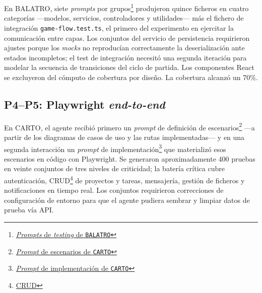 En \ac{BALATRO}, siete \textit{prompts} por grupos\footnote{\href{https://github.com/alu0101549491/TFG-Fabian-Gonzalez-Lence/tree/main/resources/prompts/3-MiniBalatro/5-TestingPorGrupodeModulos}{\textit{Prompts} de \textit{testing} de \texttt{BALATRO}}} produjeron quince ficheros en cuatro categorías ---modelos, servicios, controladores y utilidades--- más el fichero de integración \texttt{game-flow.test.ts}, el primero del experimento en ejercitar la comunicación entre capas. Los conjuntos del servicio de persistencia requirieron ajustes porque los \textit{mocks} no reproducían correctamente la deserialización ante estados incompletos; el test de integración necesitó una segunda iteración para modelar la secuencia de transiciones del ciclo de partida. Los componentes React se excluyeron del cómputo de cobertura por diseño. La cobertura alcanzó un 70\%.

\subsection{P4--P5: Playwright \textit{end-to-end}}

En \ac{CARTO}, el agente recibió primero un \textit{prompt} de definición de escenarios\footnote{\href{https://github.com/alu0101549491/TFG-Fabian-Gonzalez-Lence/blob/main/resources/prompts/4-CartographicProjectManager/5-TestingDeLaAplicacion/test-scenarios.prompt.md}{\textit{Prompt} de escenarios de \texttt{CARTO}}} ---a partir de los diagramas de casos de uso y las rutas implementadas--- y en una segunda interacción un \textit{prompt} de implementación\footnote{\href{https://github.com/alu0101549491/TFG-Fabian-Gonzalez-Lence/blob/main/resources/prompts/4-CartographicProjectManager/5-TestingDeLaAplicacion/test-implementations.prompt.md}{\textit{Prompt} de implementación de \texttt{CARTO}}} que materializó esos escenarios en código con Playwright. Se generaron aproximadamente 400 pruebas en veinte conjuntos de tres niveles de criticidad; la batería crítica cubre autenticación, CRUD\footnote{\href{https://es.wikipedia.org/wiki/CRUD}{CRUD}} de proyectos y tareas, mensajería, gestión de ficheros y notificaciones en tiempo real. Los conjuntos requirieron correcciones de configuración de entorno para que el agente pudiera sembrar y limpiar datos de prueba vía \ac{API}.\\

